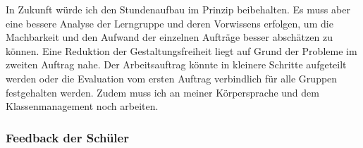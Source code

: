 In Zukunft würde ich den Stundenaufbau im Prinzip beibehalten. Es muss aber eine bessere Analyse der Lerngruppe und deren Vorwissens erfolgen, um die Machbarkeit und den Aufwand der einzelnen Aufträge besser abschätzen zu können. Eine Reduktion der Gestaltungsfreiheit liegt auf Grund der Probleme im zweiten Auftrag nahe. Der Arbeitsauftrag könnte in kleinere Schritte aufgeteilt werden oder die Evaluation vom ersten Auftrag verbindlich für alle Gruppen festgehalten werden. Zudem muss ich an meiner Körpersprache und dem Klassenmanagement noch arbeiten. 
\subsubsection{Feedback der Schüler}